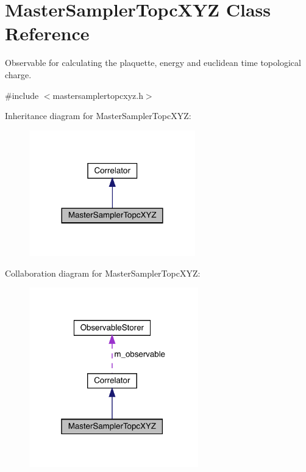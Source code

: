 \hypertarget{class_master_sampler_topc_x_y_z}{}\section{Master\+Sampler\+Topc\+X\+YZ Class Reference}
\label{class_master_sampler_topc_x_y_z}


Observable for calculating the plaquette, energy and euclidean time topological charge.  




{\ttfamily \#include $<$mastersamplertopcxyz.\+h$>$}



Inheritance diagram for Master\+Sampler\+Topc\+X\+YZ\+:\nopagebreak
\begin{figure}[H]
\begin{center}
\leavevmode
\includegraphics[width=204pt]{class_master_sampler_topc_x_y_z__inherit__graph}
\end{center}
\end{figure}


Collaboration diagram for Master\+Sampler\+Topc\+X\+YZ\+:\nopagebreak
\begin{figure}[H]
\begin{center}
\leavevmode
\includegraphics[width=208pt]{class_master_sampler_topc_x_y_z__coll__graph}
\end{center}
\end{figure}
